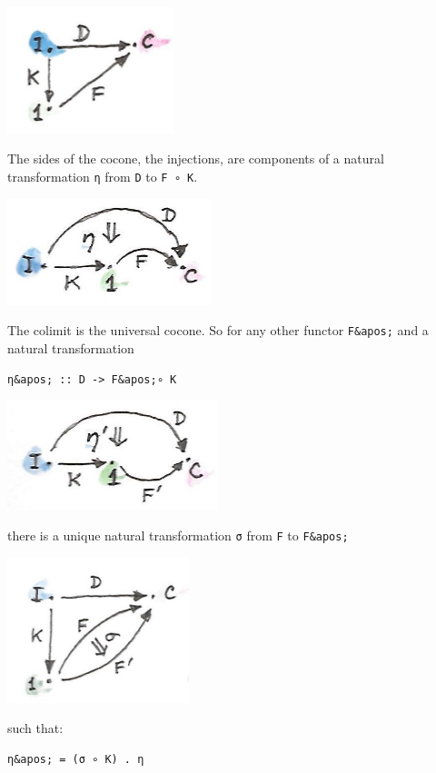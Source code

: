 \includegraphics[width=1.90625in]{images/kan81.jpg}

The sides of the cocone, the injections, are components of a natural
transformation \texttt{η} from \texttt{D} to \texttt{F\ ∘\ K}.

\includegraphics[width=2.33333in]{images/kan10a.jpg}

The colimit is the universal cocone. So for any other functor
\texttt{F\&apos;} and a natural transformation

\begin{verbatim}
η&apos; :: D -> F&apos;∘ K
\end{verbatim}

\includegraphics[width=2.40625in]{images/kan10b.jpg}

there is a unique natural transformation \texttt{σ} from \texttt{F} to
\texttt{F\&apos;}

\includegraphics[width=2.08333in]{images/kan14.jpg}

such that:

\begin{verbatim}
η&apos; = (σ ∘ K) . η
\end{verbatim}

